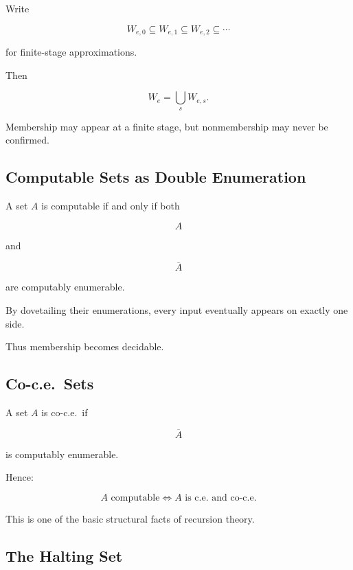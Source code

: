 Write

\[
\boxed{
W_{e,0}
\subseteq
W_{e,1}
\subseteq
W_{e,2}
\subseteq
\cdots
}
\]

for finite-stage approximations.

Then

\[
\boxed{
W_e
=
\bigcup_s
W_{e,s}.
}
\]

Membership may appear at a finite stage, but nonmembership may never be
confirmed.

\subsection{Computable Sets as Double Enumeration}
\label{subsec:computable-double-enumeration}

A set \(A\) is computable if and only if both

\[
\boxed{
A
}
\]

and

\[
\boxed{
\overline{A}
}
\]

are computably enumerable.

By dovetailing their enumerations, every input eventually appears on exactly
one side.

Thus membership becomes decidable.

\subsection{Co-c.e.\ Sets}
\label{subsec:co-ce-sets}

A set \(A\) is co-c.e.\ if

\[
\boxed{
\overline{A}
}
\]

is computably enumerable.

Hence:

\[
\boxed{
A
\text{ computable}
\iff
A
\text{ is c.e.\ and co-c.e.}
}
\]

This is one of the basic structural facts of recursion theory.

\subsection{The Halting Set}
\label{subsec:recursion-halting-set}

